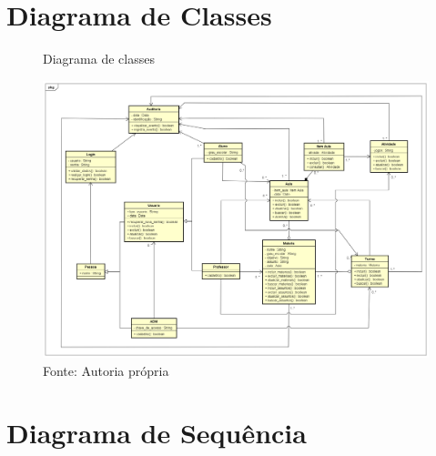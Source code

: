 \documentclass{utfpr-pg}
\begin{document}
\chapter{Diagrama de Classes}
    \label{chapter:diagrama de classes}
    \begin{figure}[H]
        \centering
        \captionsetup{width=\textwidth}
        \caption{Diagrama de classes}
        \includegraphics[width=\linewidth]{fotos/Diagrama de classe.png}
        \caption*{Fonte: Autoria própria}
        \label{fig:Diagrama de Classes}
    \end{figure}

\chapter{Diagrama de Sequência}
    \label{chapter:diagrama de sequencia}
\end{document}
